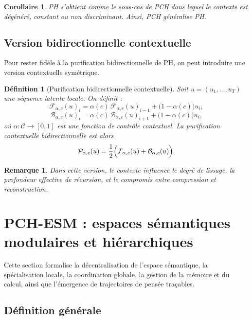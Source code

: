 \documentclass[11pt,a4paper]{article}
\newtheorem{definition}{Définition}[section]
\newtheorem{corollary}{Corollaire}[section]
\newtheorem{remark}{Remarque}[section]
\newcommand{\C}{\mathcal C}
\newcommand{\Pcal}{\mathcal P}
\newcommand{\1}{\mathbf 1}
\begin{document}
\begin{corollary}
PH s'obtient comme le sous-cas de PCH dans lequel le contexte est dégénéré, constant ou non discriminant.
Ainsi, PCH généralise PH.
\end{corollary}

\subsection{Version bidirectionnelle contextuelle}

Pour rester fidèle à la purification bidirectionnelle de PH, on peut introduire une version contextuelle symétrique.

\begin{definition}[Purification bidirectionnelle contextuelle]
Soit \(u=(u_1,\dots,u_T)\) une séquence latente locale.
On définit :
\[
\mathcal F_{\alpha,c}(u)_i
=
\alpha(c)\,\mathcal F_{\alpha,c}(u)_{i-1}
+
\bigl(1-\alpha(c)\bigr)u_i,
\]
\[
\mathcal B_{\alpha,c}(u)_i
=
\alpha(c)\,\mathcal B_{\alpha,c}(u)_{i+1}
+
\bigl(1-\alpha(c)\bigr)u_i,
\]
où \(\alpha:\C\to[0,1]\) est une fonction de contrôle contextuel.
La purification contextuelle bidirectionnelle est alors
\[
\Pcal_{\alpha,c}(u)
=
\frac12\Bigl(\mathcal F_{\alpha,c}(u)+\mathcal B_{\alpha,c}(u)\Bigr).
\]
\end{definition}

\begin{remark}
Dans cette version, le contexte influence le degré de lissage, la profondeur effective de récursion, et le compromis entre compression et reconstruction.
\end{remark}

\section{PCH-ESM : espaces sémantiques modulaires et hiérarchiques}

Cette section formalise la décentralisation de l'espace sémantique, la spécialisation locale, la coordination globale, la gestion de la mémoire et du calcul, ainsi que l'émergence de trajectoires de pensée traçables.

\subsection{Définition générale}
\end{document}
